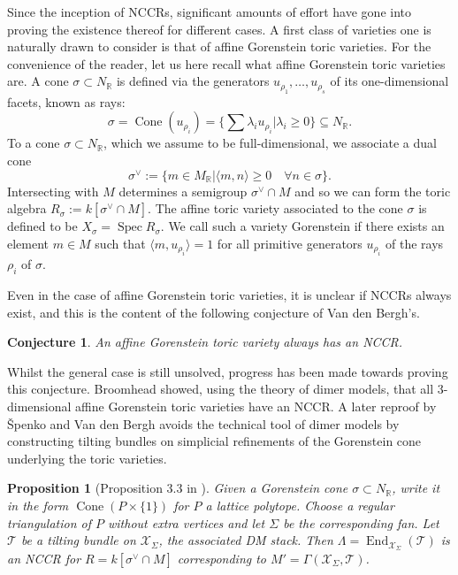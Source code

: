 \documentclass[reqno, 12pt]{amsart}
\newtheorem{proposition}[theorem]{Proposition}
\newtheorem{conjecture}[theorem]{Conjecture}
\theoremstyle{definition}
\numberwithin{equation}{section}
\newcommand{\newterm}{\textsf}
\newcommand{\R}{\mathbb{R}}
\newcommand{\End}{\operatorname{End}}
\newcommand{\spec}{\operatorname{Spec}}
\newcommand{\cone}{\operatorname{Cone}}
\begin{document}
Since the inception of NCCRs, significant amounts of effort have gone into proving the existence thereof for different cases. A first class of varieties one is naturally drawn to consider is that of affine Gorenstein toric varieties. 
For the convenience of the reader, let us here recall what affine Gorenstein toric varieties are. A cone $\sigma\subset N_\R$ is defined via the generators $u_{\rho_1},\dots,u_{\rho_s}$ of its one-dimensional facets, known as rays: \[
\sigma=\cone(u_{\rho_i})=\{\sum\lambda_i u_{\rho_i}\vert\lambda_i\geq 0\}\subseteq N_\R.
\]
To a cone $\sigma\subset N_\R$, which we assume to be full-dimensional, we associate a dual cone \[
\sigma^\vee:=\{m\in M_\R\vert \langle m,n\rangle \ge 0\quad \forall n\in \sigma\}.
\]
Intersecting with $M$ determines a semigroup $\sigma^\vee\cap M$ and so we can form the \newterm{toric algebra} $R_\sigma:=k[\sigma^\vee\cap M]$. The affine toric variety associated to the cone $\sigma$ is defined to be $X_\sigma=\spec R_\sigma$. We call such a variety \newterm{Gorenstein} if there exists an element $m\in M$ such that $\langle m,u_{\rho_i}\rangle=1$ for all primitive generators $u_{\rho_i}$ of the rays $\rho_i$ of $\sigma$. 

Even in the case of affine Gorenstein toric varieties, it is unclear if NCCRs always exist, and this is the content of the following conjecture of Van den Bergh's.
\begin{conjecture}
    \label{Conj:affineGor}
    An affine Gorenstein toric variety always has an NCCR.
\end{conjecture}

Whilst the general case is still unsolved, progress has been made towards proving this conjecture. Broomhead \cite{Broomhead} showed, using the theory of dimer models, that all 3-dimensional affine Gorenstein toric varieties have an NCCR. A later reproof by \v{S}penko and Van den Bergh \cite{SVdBtoricII} avoids the technical tool of dimer models by constructing tilting bundles on simplicial refinements of the Gorenstein cone underlying the toric varieties.
\begin{proposition}[Proposition 3.3 in \cite{SVdBtoricII}]
    \label{Prop:3.3SVDBtoricII}
    Given a Gorenstein cone $\sigma\subset N_\R$, write it in the form $\cone(P\times\{1\})$ for $P$ a lattice polytope. Choose a regular triangulation of $P$ without extra vertices and let $\Sigma$ be the corresponding fan. Let $\mathcal{T}$ be a tilting bundle on $\mathcal{X}_{\Sigma}$, the associated DM stack. Then $\Lambda=\End_{\mathcal{X}_{\Sigma}}(\mathcal{T})$ is an NCCR for $R=k[\sigma^\vee\cap M]$ corresponding to $M'=\Gamma(\mathcal{X}_{\Sigma},\mathcal{T})$.
\end{proposition}
\end{document}
